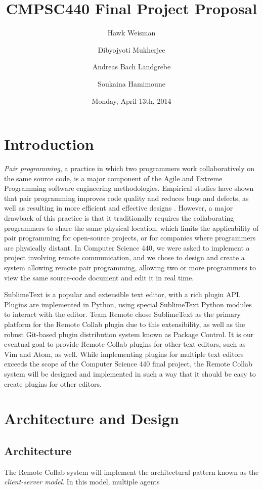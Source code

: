 \documentclass[11pt,english]{article}
\date{Monday, April 13th, 2014}
\title{CMPSC440 Final Project Proposal}
\author[1]{Hawk Weisman}
\author[1]{Dibyojyoti Mukherjee}
\author[1]{Andreas Bach Landgrebe}
\author[2]{Soukaina Hamimoune}
\affil[1]{Allegheny College, Department of Computer Science}
\affil[2]{Al Akhawayn University, Department of Computer Science}
\begin{document}
\maketitle
\section{Introduction}
	\label{sec:intro}
	\textit{Pair programming}, a practice in which two programmers work collaboratively on the same source code, is a major component of the Agile and Extreme Programming software engineering methodologies. Empirical studies have shown that pair programming improves code quality and reduces bugs and defects, as well as resulting in more efficient and effective designs \cite{cockburn2000costs}. However, a major drawback of this practice is that it traditionally requires the collaborating programmers to share the same physical location, which limits the applicability of pair programming for open-source projects, or for companies where programmers are physically distant. In Computer Science 440, we were asked to implement a project involving remote communication, and we chose to design and create a system allowing remote pair programming, allowing two or more programmers to view the same source-code document and edit it in real time.

	SublimeText is a popular and extensible text editor, with a rich plugin API. Plugins are implemented in Python, using special SublimeText Python modules to interact with the editor. Team Remote chose SublimeText as the primary platform for the Remote Collab plugin due to this extensibility, as well as the robust Git-based plugin distribution system known as Package Control. It is our eventual goal to provide Remote Collab plugins for other text editors, such as Vim and Atom, as well. While implementing plugins for multiple text editors exceeds the scope of the Computer Science 440 final project, the Remote Collab system will be designed and implemented in such a way that it should be easy to create plugins for other editors.

\section{Architecture and Design}
	\subsection{Architecture}
		The Remote Collab system will implement the architectural pattern known as the \textit{client-server model}. In this model, multiple agents 
\end{document}
